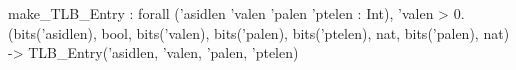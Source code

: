 make_TLB_Entry : forall ('asidlen 'valen 'palen 'ptelen : Int), 'valen > 0.
  (bits('asidlen), bool, bits('valen), bits('palen), bits('ptelen), nat, bits('palen), nat) -> TLB_Entry('asidlen, 'valen, 'palen, 'ptelen)